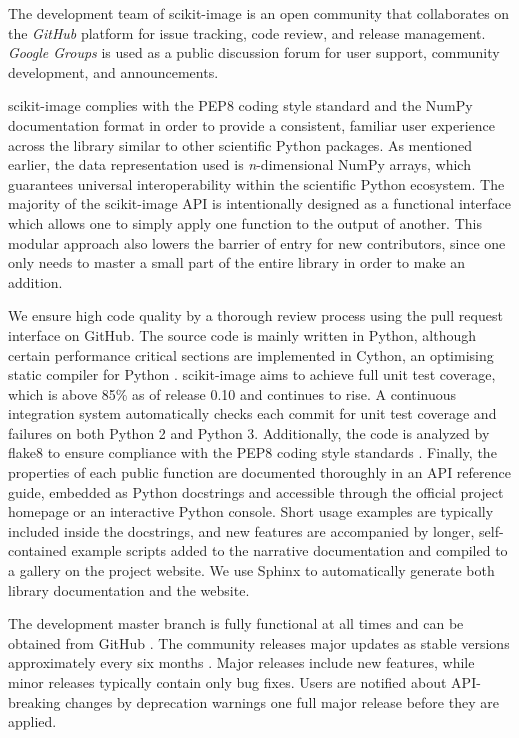 \documentclass[fleqn,12pt]{wlpeerj}
\begin{document}
The development team of scikit-image is an open community that collaborates on
the \emph{GitHub} \citep{GitHub} platform for issue tracking, code review, and release
management. \emph{Google Groups} \citep{GoogleGroups} is used as a public discussion
forum for user support, community development, and announcements.

scikit-image complies with the PEP8 coding style standard \citep{PEP8} and the NumPy
documentation format \citep{NumpyDoc} in order to provide a consistent, familiar user
experience across the library similar to other scientific Python packages. As
mentioned earlier, the data representation used is \emph{n}-dimensional
NumPy arrays, which guarantees universal interoperability
within the scientific Python ecosystem. The majority of the scikit-image API is
intentionally designed as a functional interface which allows one to simply
apply one function to the output of another. This modular approach also lowers the
barrier of entry for new contributors, since one only needs to master a small
part of the entire library in order to make an addition.

We ensure high code quality by a thorough review process using the pull request
interface on GitHub. The source code is mainly written in Python, although
certain performance critical sections are implemented in Cython, an
optimising static compiler for Python
\citep{Cython}.  scikit-image aims to achieve full unit test coverage, which is above
85\% as of release 0.10 and continues to rise. A continuous integration system
\citep{TravisCI,Coveralls} automatically checks each commit for unit test
coverage and failures on both Python 2 and Python 3. Additionally, the code is
analyzed by flake8 \citep{flake8} to ensure compliance with the PEP8 coding style
standards \citep{PEP8}. Finally, the properties of each public function are
documented thoroughly in an API reference guide, embedded as Python
docstrings and accessible through the official project homepage or an
interactive
Python console. Short usage examples are
typically included inside the docstrings, and new features are accompanied by longer,
self-contained example scripts added to the narrative documentation and
compiled to a gallery on the project website. We use Sphinx
\citep{Sphinx} to automatically generate both library documentation and the website.

The development master branch is fully functional at all times and can be
obtained from GitHub \citep{SourceCode}. The community releases major updates as
stable versions approximately every six months \citep{Versioning}. Major releases
include new features, while minor releases typically contain only bug fixes.
Users are notified about API-breaking changes by deprecation warnings one full
major release before they are applied.
\end{document}
